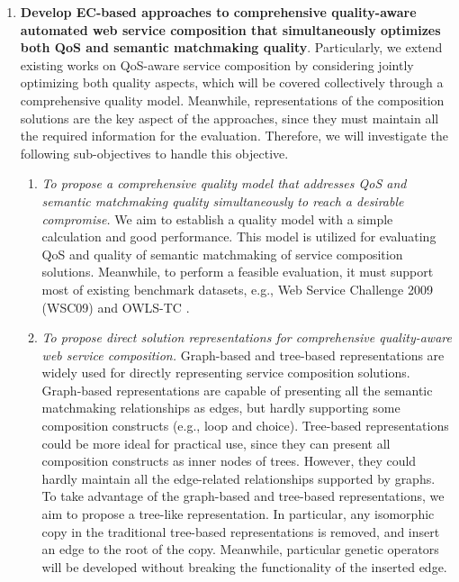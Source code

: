 \begin{enumerate}
  \item \label{Obj:1} \textbf{Develop EC-based approaches to comprehensive quality-aware automated web service composition that simultaneously optimizes both QoS and semantic matchmaking quality}. Particularly, we extend existing works on QoS-aware service composition by considering jointly optimizing both quality aspects, which will be covered collectively through a comprehensive quality model. Meanwhile, representations of the composition solutions are the key aspect of the approaches, since they must maintain all the required information for the evaluation. Therefore, we will investigate the following sub-objectives to handle this objective.
  \begin{enumerate}
    \item \emph{To propose a comprehensive quality model that addresses QoS and semantic matchmaking quality simultaneously to reach a desirable compromise.} We aim to establish a quality model with a simple calculation and good performance. This model is utilized for evaluating QoS and quality of semantic matchmaking of service composition solutions. Meanwhile, to perform a feasible evaluation, it must support most of existing benchmark datasets, e.g., Web Service Challenge 2009 (WSC09)\cite{kona2009wsc} and OWLS-TC \cite{kuster2008opossum}.
    
    \item \emph{To propose direct solution representations for comprehensive quality-aware web service composition.} Graph-based and tree-based representations are widely used for directly representing service composition solutions. Graph-based representations are capable of presenting all the semantic matchmaking relationships as edges, but hardly supporting some composition constructs (e.g., loop and choice). Tree-based representations could be more ideal for practical use, since they can present all composition constructs as inner nodes of trees. However, they could hardly maintain all the edge-related relationships supported by graphs. To take advantage of the graph-based and tree-based representations, we aim to propose a tree-like representation. In particular, any isomorphic copy in the traditional tree-based representations is removed, and insert an edge to the root of the copy. Meanwhile, particular genetic operators will be developed without breaking the functionality of the inserted edge.
    

\end{enumerate}
\end{enumerate}
